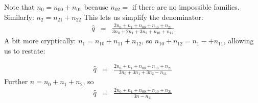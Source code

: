 \documentclass[11pt]{article}
\begin{document}
Note that $n_0 = n_{00} + n_{01}$ because $n_{02}=$ if there are no impossible families.
Similarly: $n_2 = n_{21} + n_{22}$ 
This lets us simplify the denominator:
\begin{eqnarray}
\hat{q} & = & \frac{2n_0 + n_1 + n_{00} + n_{10} +n_{21}}{3n_0 + 2n_1 + 3n_2 + n_{10} + n_{12}}  \nonumber
\end{eqnarray}
A bit more cryptically: $n_{1} = n_{10} + n_{11} + n_{12}$, so $n_{10}  + n_{12} = n_1 -+ n_{11}$, allowing us to restate:

\begin{eqnarray}
\hat{q} & = & \frac{2n_0 + n_1 + n_{00} + n_{10} +n_{21}}{3n_0 + 3n_1 + 3n_2 - n_{11}}  \nonumber
\end{eqnarray}
Further $n= n_0 + n_1 + n_2$, so
\begin{eqnarray}
\hat{q} & = & \frac{2n_0 + n_1 + n_{00} + n_{10} +n_{21}}{3n - n_{11}}  \nonumber
\end{eqnarray}
\end{document}
